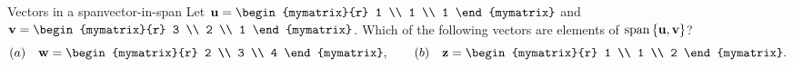 \begin{example}{Vectors in a span}{vector-in-span}
  Let $\vect{u}=\begin{mymatrix}{r} 1 \\ 1 \\ 1 \end{mymatrix}$ and
  $\vect{v}=\begin{mymatrix}{r} 3 \\ 2 \\ 1 \end{mymatrix}$. Which
  of the following vectors are elements of
  $\sspan\set{\vect{u},\vect{v}}$?
  \begin{equation*}
    (a)\quad\vect{w} = \begin{mymatrix}{r} 2 \\ 3 \\ 4 \end{mymatrix},
    \qquad
    (b)\quad\vect{z} = \begin{mymatrix}{r} 1 \\ 1 \\ 2 \end{mymatrix}.
  \end{equation*}
\end{example}

